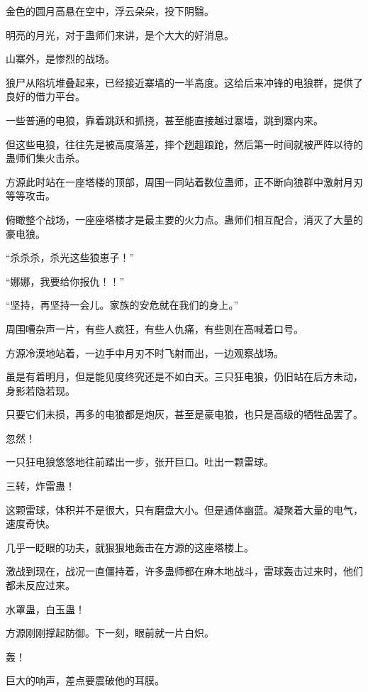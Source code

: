 
\begin{this_body}

金色的圆月高悬在空中，浮云朵朵，投下阴翳。

明亮的月光，对于蛊师们来讲，是个大大的好消息。

山寨外，是惨烈的战场。

狼尸从陷坑堆叠起来，已经接近寨墙的一半高度。这给后来冲锋的电狼群，提供了良好的借力平台。

一些普通的电狼，靠着跳跃和抓挠，甚至能直接越过寨墙，跳到寨内来。

但这些电狼，往往先是被高度落差，摔个趔趄踉跄，然后第一时间就被严阵以待的蛊师们集火击杀。

方源此时站在一座塔楼的顶部，周围一同站着数位蛊师，正不断向狼群中激射月刃等等攻击。

俯瞰整个战场，一座座塔楼才是最主要的火力点。蛊师们相互配合，消灭了大量的豪电狼。

“杀杀杀，杀光这些狼崽子！”

“娜娜，我要给你报仇！！”

“坚持，再坚持一会儿。家族的安危就在我们的身上。”

周围嘈杂声一片，有些人疯狂，有些人仇痛，有些则在高喊着口号。

方源冷漠地站着，一边手中月刃不时飞射而出，一边观察战场。

虽是有着明月，但是能见度终究还是不如白天。三只狂电狼，仍旧站在后方未动，身影若隐若现。

只要它们未损，再多的电狼都是炮灰，甚至是豪电狼，也只是高级的牺牲品罢了。

忽然！

一只狂电狼悠悠地往前踏出一步，张开巨口。吐出一颗雷球。

三转，炸雷蛊！

这颗雷球，体积并不是很大，只有磨盘大小。但是通体幽蓝。凝聚着大量的电气，速度奇快。

几乎一眨眼的功夫，就狠狠地轰击在方源的这座塔楼上。

激战到现在，战况一直僵持着，许多蛊师都在麻木地战斗，雷球轰击过来时，他们都未反应过来。

水罩蛊，白玉蛊！

方源刚刚撑起防御。下一刻，眼前就一片白炽。

轰！

巨大的响声，差点要震破他的耳膜。


\end{this_body}

